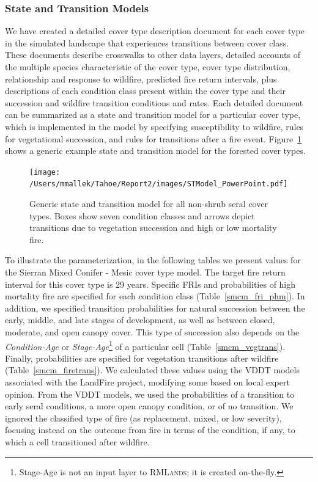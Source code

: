\subsubsection{State and Transition Models}
We have created a detailed cover type description document for each cover type in the simulated landscape that experiences transitions between cover class. These documents describe crosswalks to other data layers, detailed accounts of the multiple species characteristic of the cover type, cover type distribution, relationship and response to wildfire, predicted fire return intervals, plus descriptions of each condition class present within the cover type and their succession and wildfire transition conditions and rates.  Each detailed document can be summarized as a state and transition model for a particular cover type, which is implemented in the model by specifying susceptibility to wildfire, rules for vegetational succession, and rules for transitions after a fire event. Figure~\ref{transmodel} shows a generic example state and transition model for the forested cover types.

\begin{figure}[htbp]
\centering
\texttt{[image: /Users/mmallek/Tahoe/Report2/images/STModel\_PowerPoint.pdf]}
\caption{Generic state and transition model for all non-shrub seral cover types. Boxes show seven condition classes and arrows depict transitions due to vegetation succession and high or low mortality fire.} 
\label{transmodel}
\end{figure}

To illustrate the parameterization, in the following tables we present values for the Sierran Mixed Conifer - Mesic cover type model. The target fire return interval for this cover type is 29 years. Specific FRIs and probabilities of high mortality fire are specified for each condition class (Table~\ref{smcm_fri_phm}). In addition, we specified transition probabilities for natural succession between the early, middle, and late stages of development, as well as between closed, moderate, and open canopy cover. This type of succession also depends on the \emph{Condition-Age} or \emph{Stage-Age}\footnote{Stage-Age is not an input layer to \textsc{RMLands}; it is created on-the-fly.} of a particular cell (Table~\ref{smcm_vegtrans}). Finally, probabilities are specified for vegetation transitions after wildfire (Table~\ref{smcm_firetrans}). We calculated these values using the VDDT models associated with the LandFire project, modifying some based on local expert opinion. From the VDDT models, we used the probabilities of a transition to early seral conditions, a more open canopy condition, or of no transition. We ignored the classified type of fire (as replacement, mixed, or low severity), focusing instead on the outcome from fire in terms of the condition, if any, to which a cell transitioned after wildfire.


